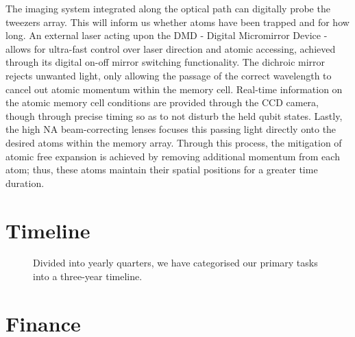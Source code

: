 \documentclass{epsrc}
\begin{document}
The imaging system integrated along the optical path can digitally probe the tweezers array. This will inform us whether atoms have been trapped and for how long. An external laser acting upon the DMD - Digital Micromirror Device - allows for ultra-fast control over laser direction and atomic accessing, achieved through its digital on-off mirror switching functionality. The dichroic mirror rejects unwanted light, only allowing the passage of the correct wavelength to cancel out atomic momentum within the memory cell. Real-time information on the atomic memory cell conditions are provided through the CCD camera, though through precise timing so as to not disturb the held qubit states. Lastly, the high NA beam-correcting lenses focuses this passing light directly onto the desired atoms within the memory array. Through this process, the mitigation of atomic free expansion is achieved by removing additional momentum from each atom; thus, these atoms maintain their spatial positions for a greater time duration. 
\vspace{16pt}

\section{Timeline}

\vspace{4pt}

\begin{figure}[!htbp]
	\begin{center}
		\vspace{-30pt}
		\caption{Divided into yearly quarters, we have categorised our primary tasks into a three-year timeline.}
		\label{fig:full}
	\end{center}
\end{figure} 

\vspace{14pt}

\section{Finance}
\end{document}
